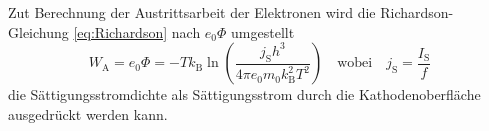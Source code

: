Zut Berechnung der Austrittsarbeit der Elektronen wird die Richardson-Gleichung \ref{eq:Richardson} nach
$e_{0} \Phi$ umgestellt
\begin{equation*}
  W_{\text{A}} = e_{0} \Phi = -T k_{\text{B}} \ln \left(\frac{j_{\text{S}} h^{3}}{4 \pi e_{0} m_{0} k_{\text{B}}^{2} T^{2}}\right)
  \quad \text{wobei} \quad
  j_\text{S} = \frac{I_\text{S}}{f}
\end{equation*}
die Sättigungsstromdichte als Sättigungsstrom durch die Kathodenoberfläche ausgedrückt werden kann.

